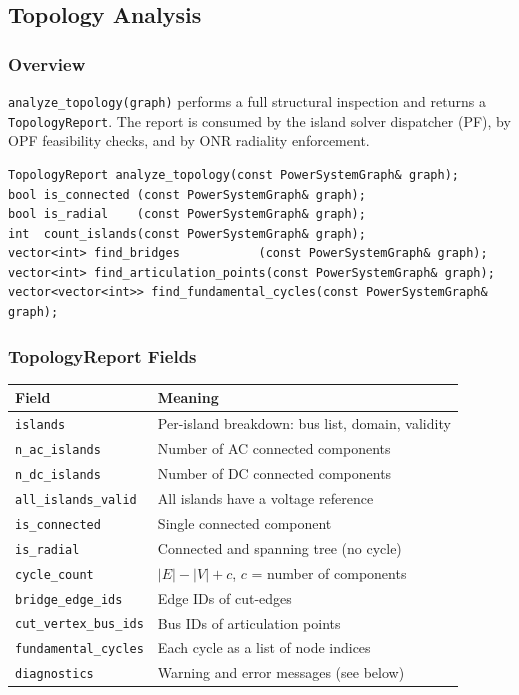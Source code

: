 \subsection{Topology Analysis}
\label{sec:graph-topology}

\subsubsection{Overview}

\texttt{analyze\_topology(graph)} performs a full structural inspection and
returns a \texttt{TopologyReport}.  The report is consumed by the island
solver dispatcher (PF), by OPF feasibility checks, and by ONR radiality
enforcement.

\begin{verbatim}
TopologyReport analyze_topology(const PowerSystemGraph& graph);
bool is_connected (const PowerSystemGraph& graph);
bool is_radial    (const PowerSystemGraph& graph);
int  count_islands(const PowerSystemGraph& graph);
vector<int> find_bridges           (const PowerSystemGraph& graph);
vector<int> find_articulation_points(const PowerSystemGraph& graph);
vector<vector<int>> find_fundamental_cycles(const PowerSystemGraph& graph);
\end{verbatim}

\subsubsection{TopologyReport Fields}

\begin{center}
\begin{tabular}{ll}
\hline\hline
\textbf{Field} & \textbf{Meaning} \\
\hline
\texttt{islands}            & Per-island breakdown: bus list, domain, validity \\
\texttt{n\_ac\_islands}     & Number of AC connected components \\
\texttt{n\_dc\_islands}     & Number of DC connected components \\
\texttt{all\_islands\_valid}& All islands have a voltage reference \\
\texttt{is\_connected}      & Single connected component \\
\texttt{is\_radial}         & Connected and spanning tree (no cycle) \\
\texttt{cycle\_count}       & $|E| - |V| + c$, $c$ = number of components \\
\texttt{bridge\_edge\_ids}  & Edge IDs of cut-edges \\
\texttt{cut\_vertex\_bus\_ids} & Bus IDs of articulation points \\
\texttt{fundamental\_cycles} & Each cycle as a list of node indices \\
\texttt{diagnostics}        & Warning and error messages (see below) \\
\hline\hline
\end{tabular}
\end{center}

